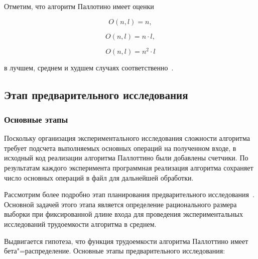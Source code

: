 \documentclass[a4paper, article, 14pt]{extarticle}
\begin{document}
Отметим, что алгоритм Паллотино имеет оценки

\begin{equation}\label{eq:pallottino_best}
	O(n, l) = n,
\end{equation}

\begin{equation}\label{eq:pallottino_average}
	O(n, l) = n \cdot l,
\end{equation}

\begin{equation}\label{eq:pallottino_worst}
	O(n, l) = n^2 \cdot l
\end{equation}

в лучшем, среднем и худшем случаях соответственно~\cite{pallottino}.

\subsection{Этап предварительного исследования}\label{sec:analysis_part_1}

\subsubsection{Основные этапы}\label{subsec:analysis_part_1_intro}

Поскольку организация экспериментального исследования сложности алгоритма требует подсчета выполняемых основных операций на полученном входе, в исходный код реализации алгоритма Паллоттино были добавлены счетчики. По результатам каждого эксперимента программная реализация алгоритма сохраняет число основных операций в файл для дальнейшей обработки.

Рассмотрим более подробно этап планирования предварительного исследования~\cite{petrushyn_ulyanov_planning}. Основной задачей этого этапа является определение рационального размера выборки при фиксированной длине входа для проведения экспериментальных исследований трудоемкости алгоритма в среднем.

Выдвигается гипотеза, что функция трудоемкости алгоритма Паллоттино имеет бета"=распределение. Основные этапы предварительного исследования:
\end{document}
